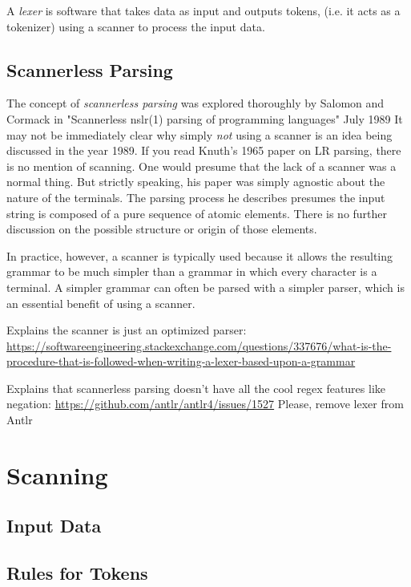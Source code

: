 \documentclass{book}
\newcommand{\newterm}[2]{\textit{#1}\index{#2}}
\begin{document}
A \newterm{lexer}{Lexer} is software that takes data as input and outputs 
tokens, (i.e. it acts as a tokenizer) using a
scanner to process the input data.


\subsection{Scannerless Parsing}

The concept of \newterm{scannerless parsing}{Scannerless Parsing} was 
explored thoroughly by Salomon and Cormack in 
"Scannerless nslr(1) parsing of programming languages" July 1989
It may not be immediately clear why simply \textit{not} using a scanner
is an idea being discussed in the year 1989. If you read Knuth's 1965 paper on
LR parsing, there is no mention of scanning. One would presume that the lack
of a scanner was a normal thing. But strictly speaking, his 
paper was simply agnostic about the nature of the 
terminals. The parsing process
he describes presumes the input string is composed of a pure sequence 
of atomic elements. There is no further discussion on the possible
structure or origin of those elements.

In practice, however, a scanner is typically used because it
allows the resulting grammar to be much simpler than a grammar
in which every character is a terminal. A simpler grammar can
often be parsed with a simpler parser, which is an essential benefit
of using a scanner.

Explains the scanner is just an optimized parser:
\url{https://softwareengineering.stackexchange.com/questions/337676/what-is-the-procedure-that-is-followed-when-writing-a-lexer-based-upon-a-grammar}

Explains that scannerless parsing doesn't have all the cool regex features like negation:
\url{https://github.com/antlr/antlr4/issues/1527} Please, remove lexer from Antlr

\section{Scanning}

\subsection{Input Data}

\subsection{Rules for Tokens}
                      
\end{document}
